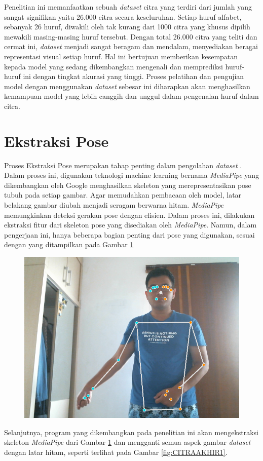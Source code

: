 Penelitian ini memanfaatkan sebuah \textit{dataset} citra yang terdiri dari jumlah yang sangat signifikan yaitu 26.000 citra secara keseluruhan. Setiap huruf alfabet, sebanyak 26 huruf, diwakili oleh tak kurang dari 1000 citra yang khusus dipilih mewakili masing-masing huruf tersebut. Dengan total 26.000 citra yang teliti dan cermat ini, \textit{dataset} menjadi sangat beragam dan mendalam, menyediakan beragai representasi visual setiap huruf. Hal ini bertujuan memberikan kesempatan kepada model yang sedang dikembangkan mengenali dan memprediksi huruf-huruf ini dengan tingkat akurasi yang tinggi. Proses pelatihan dan pengujian model dengan menggunakan \textit{dataset} sebesar ini diharapkan akan menghasilkan kemampuan model yang lebih canggih dan unggul dalam pengenalan huruf dalam citra.
\section{Ekstraksi Pose}
Proses Ekstraksi Pose merupakan tahap penting dalam pengolahan \textit{dataset} . Dalam proses ini, digunakan teknologi machine learning bernama \textit{MediaPipe} yang dikembangkan oleh Google menghasilkan skeleton yang merepresentasikan pose tubuh pada setiap gambar. Agar memudahkan pembacaan oleh model, latar belakang gambar diubah menjadi seragam berwarna hitam. \textit{MediaPipe} memungkinkan deteksi gerakan pose dengan efisien. Dalam proses ini, dilakukan ekstraksi fitur dari skeleton pose yang disediakan oleh \textit{MediaPipe}. Namun, dalam pengerjaan ini, hanya beberapa bagian penting dari  pose yang digunakan, sesuai dengan yang ditampilkan pada Gambar \ref{fig:CITRAAWAL1}
\begin{figure}[hbt!]
	\centering
	\includegraphics[width=0.6\linewidth]{gambar/Gambar3.3.png}
	\label{fig:CITRAAWAL1}
\end{figure}
Selanjutnya, program yang dikembangkan pada penelitian ini akan mengekstraksi skeleton \textit{MediaPipe} dari Gambar \ref{fig:CITRAAWAL1} dan mengganti semua aspek gambar \textit{dataset} dengan latar hitam, seperti terlihat pada Gambar \ref{fig:CITRAAKHIR1}.
